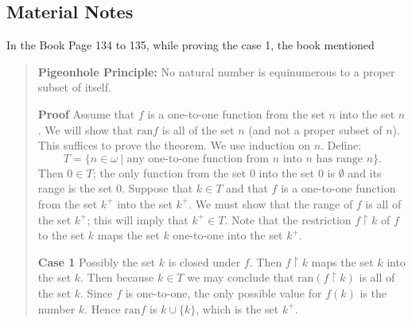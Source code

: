\subsection{Material Notes}

In the Book Page 134 to 135, while proving the case 1, the book mentioned

\begin{quote}
    \textbf{Pigeonhole Principle:} No natural number is equinumerous to a proper subset of itself.

    \textbf{Proof} Assume that \(f\) is a one-to-one function from the set \(n\) into the set \(n\). We will show that \(\text{ran} f\) is all of the set \(n\) (and not a proper subset of \(n\)). This suffices to prove the theorem.
    We use induction on \(n\). Define:
    \[
    T = \{ n \in \omega \mid \text{any one-to-one function from } n \text{ into } n \text{ has range } n \}.
    \]
    Then \(0 \in T\); the only function from the set \(0\) into the set \(0\) is \(\emptyset\) and its range is the set \(0\). Suppose that \(k \in T\) and that \(f\) is a one-to-one function from the set \(k^+\) into the set \(k^+\). We must show that the range of \(f\) is all of the set \(k^+\); this will imply that \(k^+ \in T\). Note that the restriction \(f \upharpoonright k\) of \(f\) to the set \(k\) maps the set \(k\) one-to-one into the set \(k^+\).

    \textbf{Case 1} Possibly the set \(k\) is closed under \(f\). Then \(f \upharpoonright k\) maps the set \(k\) into the set \(k\). Then because \(k \in T\) we may conclude that \(\text{ran} (f \upharpoonright k)\) is all of the set \(k\). Since \(f\) is one-to-one, the only possible value for \(f(k)\) is the number \(k\). Hence \(\text{ran} f\) is \(k \cup \{k\}\), which is the set \(k^+\).  
\end{quote}
